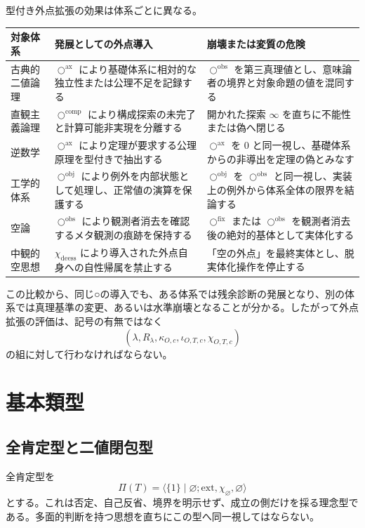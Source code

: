 \documentclass[a4paper,11pt]{ltjsarticle}
\theoremstyle{definition}
\theoremstyle{plain}
\newcommand{\Phase}{\Pi}
\newcommand{\ofix}{\bigcirc^{\mathrm{fix}}}
\newcommand{\oobs}{\bigcirc^{\mathrm{obs}}}
\newcommand{\oobj}{\bigcirc^{\mathrm{obj}}}
\newcommand{\oax}{\bigcirc^{\mathrm{ax}}}
\newcommand{\ocomp}{\bigcirc^{\mathrm{comp}}}
\newcommand{\TruthCriterion}{\kappa}
\begin{document}
型付き外点拡張の効果は体系ごとに異なる。
\begin{center}
\small
\begin{tabular}{>{\raggedright\arraybackslash}p{} >{\raggedright\arraybackslash}p{} >{\raggedright\arraybackslash}p{}}
\toprule
対象体系 & 発展としての外点導入 & 崩壊または変質の危険 \\
\midrule
古典的二値論理 & $\oax$ により基礎体系に相対的な独立性または公理不足を記録する & $\oobs$ を第三真理値とし、意味論者の境界と対象命題の値を混同する \\
直観主義論理 & $\ocomp$ により構成探索の未完了と計算可能非実現を分離する & 開かれた探索 $\infty$ を直ちに不能性または偽へ閉じる \\
逆数学 & $\oax$ により定理が要求する公理原理を型付きで抽出する & $\oax$ を $0$ と同一視し、基礎体系からの非導出を定理の偽とみなす \\
工学的体系 & $\oobj$ により例外を内部状態として処理し、正常値の演算を保護する & $\oobj$ を $\oobs$ と同一視し、実装上の例外から体系全体の限界を結論する \\
空論 & $\oobs$ により観測者消去を確認するメタ観測の痕跡を保持する & $\ofix$ または $\oobs$ を観測者消去後の絶対的基体として実体化する \\
中観的空思想 & $\chi_{\mathrm{deess}}$ により導入された外点自身への自性帰属を禁止する & 「空の外点」を最終実体とし、脱実体化操作を停止する \\
\bottomrule
\end{tabular}
\end{center}

この比較から、同じ○の導入でも、ある体系では残余診断の発展となり、別の体系では真理基準の変更、あるいは水準崩壊となることが分かる。したがって外点拡張の評価は、記号の有無ではなく
\[
 (\lambda,R_\lambda,
  \TruthCriterion_{O,c},
  \iota_{O,T,c},
  \chi_{O,T,c})
\]
の組に対して行わなければならない。

\section{基本類型}

\subsection{全肯定型と二値閉包型}

全肯定型を
\[
 \Phase(T)=
 \langle\{1\}\mid\varnothing;
 \mathrm{ext},\chi_{\varnothing},\varnothing\rangle
\]
とする。これは否定、自己反省、境界を明示せず、成立の側だけを採る理念型である。多面的判断を持つ思想を直ちにこの型へ同一視してはならない。
\end{document}
